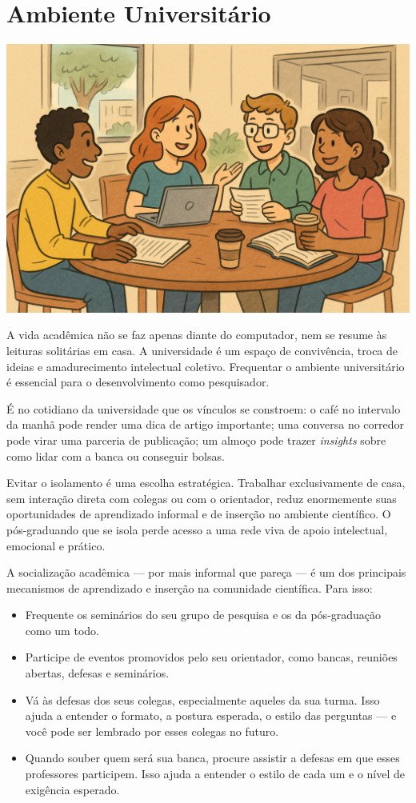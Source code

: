\chapter{Ambiente Universitário}

\begin{center}
\includegraphics[width=0.5\linewidth]{Images/ambiente.png}    
\end{center}
\vspace{0.5cm}

A vida acadêmica não se faz apenas diante do computador, nem se resume às leituras solitárias em casa. A universidade é um espaço de convivência, troca de ideias e amadurecimento intelectual coletivo. Frequentar o ambiente universitário é essencial para o desenvolvimento como pesquisador.


É no cotidiano da universidade que os vínculos se constroem: o café no intervalo da manhã pode render uma dica de artigo importante; uma conversa no corredor pode virar uma parceria de publicação; um almoço pode trazer \textit{insights} sobre como lidar com a banca ou conseguir bolsas. 

Evitar o isolamento é uma escolha estratégica. Trabalhar exclusivamente de casa, sem interação direta com colegas ou com o orientador, reduz enormemente suas oportunidades de aprendizado informal e de inserção no ambiente científico. O pós-graduando que se isola perde acesso a uma rede viva de apoio intelectual, emocional e prático.

A socialização acadêmica — por mais informal que pareça — é um dos principais mecanismos de aprendizado e inserção na comunidade científica. Para isso: 

\begin{itemize}
    \item Frequente os seminários do seu grupo de pesquisa e os da pós-graduação como um todo.
    \item Participe de eventos promovidos pelo seu orientador, como bancas, reuniões abertas, defesas e seminários.
    \item Vá às defesas dos seus colegas, especialmente aqueles da sua turma. Isso ajuda a entender o formato, a postura esperada, o estilo das perguntas — e você pode ser lembrado por esses colegas no futuro.
    \item Quando souber quem será sua banca, procure assistir a defesas em que esses professores participem. Isso ajuda a entender o estilo de cada um e o nível de exigência esperado.
\end{itemize}

